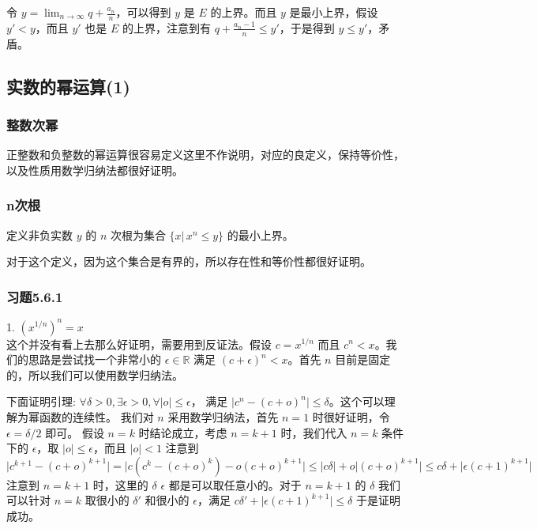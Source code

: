 令 $y = \lim_{n \to \infty} q + \frac{a_n}{n}$，可以得到 $y$ 是 $E$ 的上界。而且 $y$ 是最小上界，假设 $y' < y$，而且 $y'$ 也是 $E$ 的上界，注意到有 $q + \frac{a_n-1}{n} \le y'$，于是得到 $y \le y'$，矛盾。

\subsection{实数的幂运算(1)}

\subsubsection{整数次幂}
正整数和负整数的幂运算很容易定义这里不作说明，对应的良定义，保持等价性，以及性质用数学归纳法都很好证明。

\subsubsection{n次根}
定义非负实数 $y$ 的 $n$ 次根为集合 $ \{ x \vert \, x^n \le y \} $ 的最小上界。

对于这个定义，因为这个集合是有界的，所以存在性和等价性都很好证明。

\subsubsection{习题5.6.1}

1. $(x^{1/n})^n = x$\\

这个并没有看上去那么好证明，需要用到反证法。假设 $c = x^{1/n}$ 而且 $ c^n < x$。我们的思路是尝试找一个非常小的 $\epsilon \in \mathbb{R}$ 满足 $(c+\epsilon)^n < x$。首先 $n$ 目前是固定的，所以我们可以使用数学归纳法。

下面证明引理: $\forall \delta > 0, \exists \epsilon > 0 , \forall \lvert o \rvert \le \epsilon $， 满足 $ \lvert c^n - (c+o)^n \rvert \le \delta $。这个可以理解为幂函数的连续性。
我们对 $n $ 采用数学归纳法，首先 $n = 1$ 时很好证明，令 $\epsilon = \delta / 2$ 即可。
假设 $n = k$ 时结论成立，考虑 $n = k + 1$ 时，我们代入 $n = k$ 条件下的 $\epsilon$，取 $ \lvert o \rvert \le \epsilon $，而且 $\lvert o \rvert < 1$ 注意到 $\lvert c^{k+1} - (c+o)^{k+1} \rvert = \lvert c(c^k - (c+o)^k) - o(c+o)^{k+1} \rvert \le  \lvert c \delta \rvert  + o \lvert (c+o)^{k+1} \rvert \le  c \delta + \lvert \epsilon (c+1)^{k+1} \rvert $
注意到 $n = k + 1$ 时，这里的 $\delta$ $\epsilon $ 都是可以取任意小的。对于 $n = k + 1$ 的 $\delta $ 我们可以针对 $n = k$ 取很小的 $\delta' $ 和很小的 $\epsilon $，满足 
$c \delta' + \lvert \epsilon (c+1)^{k+1} \rvert  \le \delta $ 于是证明成功。 \\

